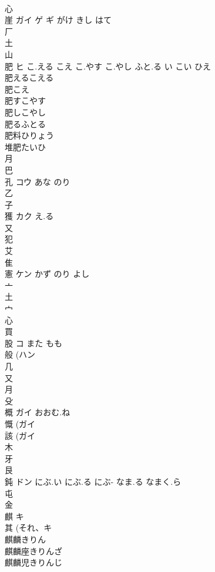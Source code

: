 \documentclass[8pt]{extreport}
\begin{document}
\begin{CJK}{UTF8}{min}
\\	心 
\\	崖	ガイ ゲ ギ	がけ きし はて	
\\	厂 
\\	土 
\\	山 
\\	肥	ヒ	こ.える こえ こ.やす こ.やし ふと.る い こい ひえ	
\\	肥えるこえる 
\\	肥こえ 
\\	肥すこやす
\\	肥しこやし
\\	肥るふとる
\\	肥料ひりょう 
\\	堆肥たいひ 
\\	月 
\\	巴 
\\	孔	コウ	あな のり	
\\	乙 
\\	子 
\\	獲	カク	え.る	
\\	又 
\\	犯 
\\	艾 
\\	隹 
\\	憲	ケン	かず のり よし	
\\	亠 
\\	土 
\\	宀 
\\	心 
\\	買 
\\	股	コ	また もも	
\\	般 (ハン 
\\	几 
\\	又 
\\	月 
\\	殳 
\\	概	ガイ	おおむ.ね	
\\	慨 (ガイ 
\\	該 (ガイ 
\\	木 
\\	牙 
\\	艮 
\\	鈍	ドン	にぶ.い にぶ.る にぶ- なま.る なまく.ら	
\\	屯 
\\	金 
\\	麒	キ		
\\	其 (それ、キ 
\\	麒麟きりん 
\\	麒麟座きりんざ 
\\	麒麟児きりんじ 

\end{CJK}
\end{document}
